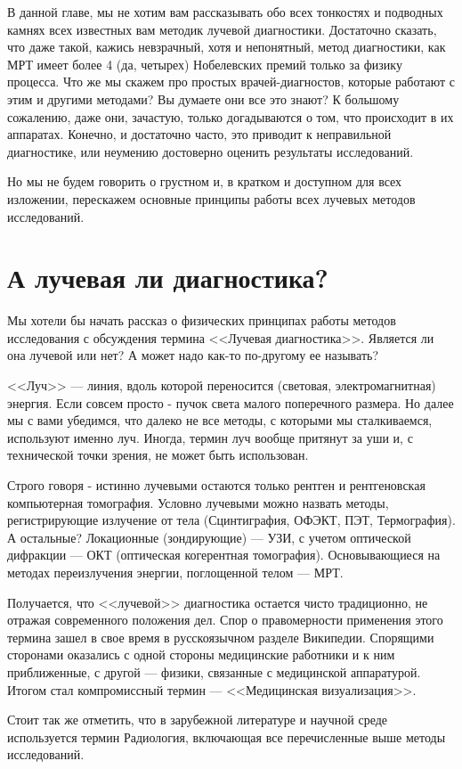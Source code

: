 В данной главе, мы не хотим вам рассказывать обо всех тонкостях и подводных камнях всех известных вам методик лучевой диагностики. Достаточно сказать, что даже такой, кажись невзрачный, хотя и непонятный, метод диагностики, как МРТ имеет более 4 (да, четырех) Нобелевских премий только за физику процесса. Что же мы скажем про простых врачей-диагностов, которые работают с этим и другими методами? Вы думаете они все это знают? К большому сожалению, даже они, зачастую, только догадываются о том,  что происходит в их аппаратах. Конечно, и достаточно часто, это приводит к неправильной диагностике, или неумению достоверно оценить результаты исследований.

Но мы не будем говорить о грустном и, в кратком и доступном для всех изложении, перескажем основные принципы работы всех лучевых методов исследований.

\section{А лучевая ли диагностика?}

Мы хотели бы начать рассказ о физических принципах работы методов исследования с обсуждения термина <<Лучевая диагностика>>. Является ли она лучевой или нет? А может надо как-то по-другому ее называть?

<<Луч>> --- линия, вдоль которой переносится (световая, электромагнитная) энергия. Если совсем просто - пучок света малого поперечного размера. Но далее мы с вами убедимся, что далеко не все методы, с которыми мы сталкиваемся, используют именно луч. Иногда, термин луч вообще притянут за уши и, с технической точки зрения, не может быть использован. 

Строго говоря - истинно лучевыми остаются только рентген и рентгеновская компьютерная томография. Условно лучевыми можно назвать методы, регистрирующие излучение от тела (Сцинтиграфия, ОФЭКТ, ПЭТ, Термография). А остальные? Локационные (зондирующие) --- УЗИ, с учетом оптической дифракции --- ОКТ (оптическая когерентная томография). Основывающиеся на методах переизлучения энергии, поглощенной телом --- МРТ. 

Получается, что <<лучевой>> диагностика остается чисто традиционно, не отражая современного положения дел. Спор о правомерности применения этого термина зашел в свое время в русскоязычном разделе Википедии. Спорящими сторонами оказались с одной стороны медицинские работники и к ним приближенные, с другой --- физики, связанные с медицинской аппаратурой. Итогом стал компромиссный термин --- <<Медицинская визуализация>>.

Стоит так же отметить, что в зарубежной литературе и научной среде используется термин Радиология, включающая все перечисленные выше методы исследований.
